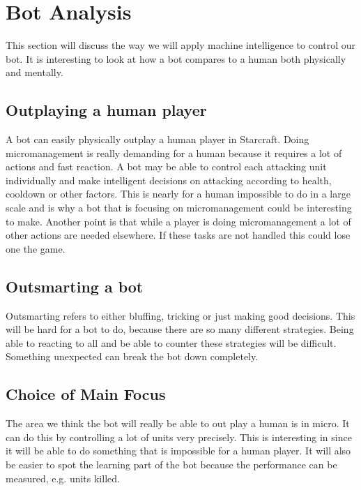 \section{Bot Analysis}
	This section will discuss the way we will apply machine intelligence to control our bot. It is interesting to look at how a bot compares to a human both physically and mentally. 
	
	\subsection*{Outplaying a human player}
		A bot can easily physically outplay a human player in Starcraft. 
		Doing micromanagement is really demanding for a human because it requires a lot of actions and fast reaction. A bot may be able to control each 
		attacking unit individually and make intelligent decisions on attacking according to health, cooldown or other factors. This is nearly for a human
		impossible to do in a large scale and is why a bot that is focusing on micromanagement could be interesting to make. Another point 
		is that while a player is doing micromanagement a lot of other actions are needed elsewhere. If these tasks are not handled this could lose one the game.
		
	\subsection*{Outsmarting a bot}
		Outsmarting refers to either bluffing, tricking or just making good decisions. This will be hard for a bot to do, because there are so many 
		different strategies. Being able to reacting to all and be able to counter these strategies will be difficult. Something unexpected 
		can break the bot down completely.

\subsection{Choice of Main Focus}
	The area we think the bot will really be able to out play a human is in micro. It can do this by controlling a lot of units very precisely. This is interesting in since it will be able to do something that is impossible for a human player. It will also be easier to spot the learning part of the bot because the performance can be measured, e.g. units killed.